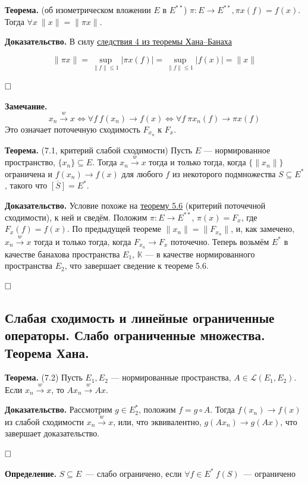 \documentclass[12pt, a4paper]{article}
\newcommand{\QED}{$\hfill\square$}
\renewcommand{\le}{\leqslant}  %
\renewcommand{\subset}{\subseteq}   %
\begin{document}
\textbf{Теорема.} (об изометрическом вложении $E$ в $E^{**}$) $\pi: E \to E^{**}, \pi x(f) = f(x)$. Тогда $\forall x \ \|x\| =\|\pi x\|$.

\textbf{Доказательство.}
В силу \hyperref[th:hahn-banach-coll-4]{следствия 4 из теоремы Хана--Банаха}

\[ \| \pi x \| = \sup_{\|f\|\le1} |\pi x(f)|=\sup_{\| f \| \le 1} |f(x)|=\|x\| \]

\QED

\textbf{Замечание.}
    \[x_n \xrightarrow{w} x \Longleftrightarrow \forall f \ f(x_n) \to f(x) \Longleftrightarrow \forall f \ \pi x_n(f) \to \pi x(f) \]
    Это означает поточечную сходимость $F_{x_n}$ к $F_x$.

 \label{th:7-1} \textbf{Теорема.} (7.1, критерий слабой сходимости) Пусть $E$ --- нормированное пространство, $\{x_n\} \subset E$.
Тогда $x_n \xrightarrow{w} x$ тогда и только тогда, когда $\{\|x_n\|\}$ ограничена и $f(x_n) \to f(x)$ для любого $f$ из некоторого подмножества $S \subset E^*$, такого что $\overline{[S]} = E^*$.

\textbf{Доказательство.} Условие похоже на \hyperref[th:5-6]{теорему 5.6} (критерий поточечной сходимости), к ней и сведём.
Положим $\pi: E \to E^{**}$, $\pi(x) = F_x$, где $F_x(f) = f(x)$.
По предыдущей теореме $\|x_n\| = \|F_{x_n}\|$, и, как замечено, $x_n \xrightarrow{w} x$ тогда и только тогда, когда $F_{x_n} \to F_x$ поточечно. Теперь возьмём $E^*$ в качестве банахова пространства $E_1$, $\mathbb K$ --- в качестве нормированного пространства $E_2$, что завершает сведение к теореме 5.6.

\QED

\subsection{Слабая сходимость и линейные ограниченные операторы. Слабо ограниченные множества. Теорема Хана.}


 \label{th:7-2} \textbf{Теорема.} (7.2) Пусть $E_1, E_2$ --- нормированные пространства, $A \in \mathcal L(E_1, E_2)$.
Если $x_n \xrightarrow{w} x$, то $Ax_n \xrightarrow{w} Ax$.

\textbf{Доказательство.} Рассмотрим $g \in E_2^*$, положим $f = g \circ A$.
Тогда $f(x_n) \to f(x)$ из слабой сходимости $x_n \xrightarrow{w} x$, или, что эквивалентно, $g(Ax_n) \to g(Ax)$, что завершает доказательство.

\QED

\textbf{Определение.}
$S \subset E$~--- слабо ограничено, если $\forall f \in E^* \: f(S)$~--- ограничено
\end{document}

